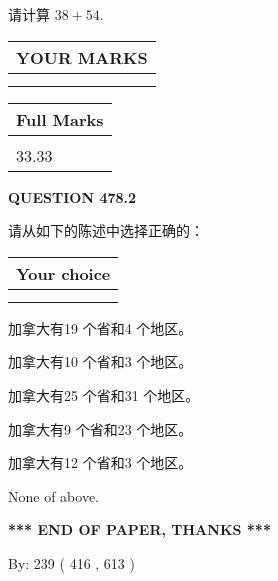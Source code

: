 \documentclass{ctexart}
\begin{document}
  
 
请计算 $ %
38 +  %
54 $.
 

 

 
  
\vspace{0.2in}
  
\noindent\begin{tabular}{|l|}
\hline
 YOUR MARKS  \\
\hline
 \\ 
 \\ 
\hline
\end{tabular}
\hspace{0.05in} \begin{tabular}{|l|}
\hline
 Full Marks  \\
\hline
 \\ 
33.33 \\
\hline
\end{tabular}
{\textbf{\Large{QUESTION
478.2 
}}}
  
  
请从如下的陈述中选择正确的：
  
  
\noindent\hspace{3.0in} \begin{tabular}{|l|}
\hline
Your choice \\
\hline
 \\ 
 \\ 
\hline
\end{tabular}
  
  
 
 
加拿大有19 个省和4 个地区。
 
 
加拿大有10 个省和3 个地区。
 
 
加拿大有25 个省和31 个地区。
 
 
加拿大有9 个省和23 个地区。
 
 
加拿大有12 个省和3 个地区。
 
 
 None of above.
 
 
   
   
 \vspace{0.2in}
 
   
   
   
   
\vspace{1.0in} 
{\textbf{\large{ *** END OF PAPER, THANKS *** }}} 
   
   
\hspace{1.0in} By: 
 239 ( 416 ,  613 )
   
\end{document}
